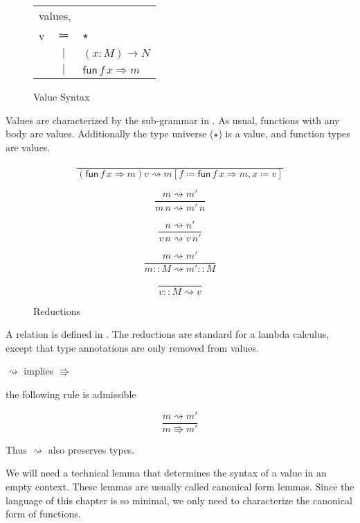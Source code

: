 \begin{figure}
\begin{tabular}{lcl}
\multicolumn{3}{l}{values,}\tabularnewline
v & $\Coloneqq$ & $\star$\tabularnewline
 & $|$ & $\left(x:M\right)\rightarrow N$\tabularnewline
 & $|$ & $\mathsf{fun}\,f\,x\Rightarrow m$\tabularnewline
\end{tabular}\caption{\SLang{} Value Syntax}
\label{fig:surface-value-syntax}
\end{figure}
 
Values are characterized by the sub-grammar in .
As usual, functions with any body are values.
Additionally the type universe ($\star$) is a value, and function types are values.
 
\begin{figure}
\[
\frac{\,}{\left(\mathsf{fun}\,f\,x\Rightarrow m\right)v\rightsquigarrow m\left[f\coloneqq\mathsf{fun}\,f\,x\Rightarrow m,x\coloneqq v\right]}
\]
 
\[
\frac{m\rightsquigarrow m'}{m\,n\rightsquigarrow m'\,n}
\]
 
\[
\frac{n\rightsquigarrow n'}{v\,n\rightsquigarrow v\,n'}
\]
 
\[
\frac{m\rightsquigarrow m'}{m::M\rightsquigarrow m'::M}
\]
 
\[
\frac{\,}{v::M\rightsquigarrow v}
\]
 
\caption{\SLang{} \CbV{} Reductions}
\label{fig:surface-reduction-step}
\end{figure}
 
A \cbv{} relation is defined in .
The reductions are standard for a \cbv{} lambda calculus, except that type annotations are only removed from values.
 
\begin{fact}
$\rightsquigarrow$ implies $\Rrightarrow$
 
the following rule is admissible
 
\[
\frac{m\rightsquigarrow m'}{m\Rrightarrow m'}
\]
\end{fact}
 
Thus $\rightsquigarrow$ also preserves types.
 
We will need a technical lemma that determines the syntax of a value in an empty context.
These lemmas are usually called canonical form lemmas.
Since the language of this chapter is so minimal, we only need to characterize the canonical form of functions.
 

